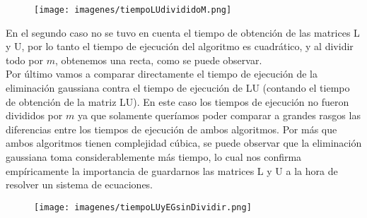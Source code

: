 \begin{figure}[h]
  \center
  \texttt{[image: imagenes/tiempoLUdivididoM.png]}
  \label{fig:ludivididom}
\end{figure}


En el segundo caso no se tuvo en cuenta el tiempo de obtención de las matrices L y U, por lo tanto el tiempo de ejecución del algoritmo es cuadrático, y al dividir todo por $m$, obtenemos una recta, como se puede observar. \\


Por último vamos a comparar directamente el tiempo de ejecución de la eliminación gaussiana contra el tiempo de ejecución de LU (contando el tiempo de obtención de la matriz LU). En este caso los tiempos de ejecución no fueron divididos por $m$ ya que solamente queríamos poder comparar a grandes rasgos las diferencias entre los tiempos de ejecución de ambos algoritmos. Por más que ambos algoritmos tienen complejidad cúbica, se puede observar que la eliminación gaussiana toma considerablemente más tiempo, lo cual nos confirma empíricamente la importancia de guardarnos las matrices L y U a la hora de resolver un sistema de ecuaciones.

\newpage

\begin{figure}[h]
  \center
  \texttt{[image: imagenes/tiempoLUyEGsinDividir.png]}
  \label{fig:luyeg}
\end{figure}

